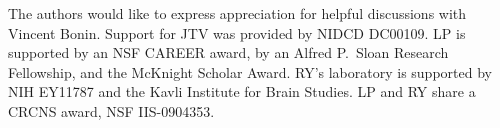 The authors would like to express appreciation for helpful discussions with Vincent Bonin.  Support for JTV was provided by NIDCD DC00109. LP is supported by an NSF CAREER award, by an Alfred P.\ Sloan Research Fellowship, and the McKnight Scholar Award. RY's laboratory is supported by NIH EY11787 and the Kavli Institute for Brain Studies. LP and RY share a CRCNS award, NSF IIS-0904353.

\appendix

\clearpage

%
%

%

% 

